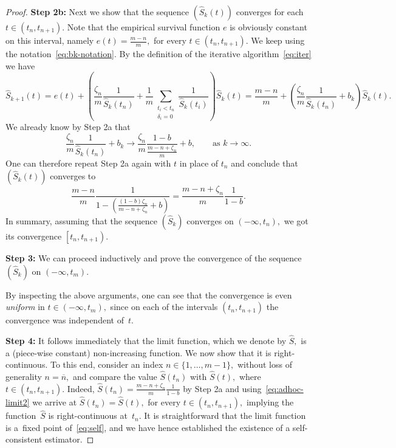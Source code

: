 \documentclass{amsart}
\theoremstyle{plain}
\theoremstyle{definition}
\def\l{\left}
\def\r{\right}
\newcommand{\rec}[1]{\frac{1}{#1}}
\def\on{\overline{n}}
\renewcommand{\hat}{\widehat}
\begin{document}
\begin{proof}
\textbf{Step 2b:} Next we show that the sequence $\l(\hat{S}_k(t)\r)$ converges for each $t\in\l(t_n,t_{n+1}\r).$ Note that the empirical survival function $e$ is obviously constant on this interval, namely $e(t)=\frac{m-n}{m},$ for every $t\in\l(t_n,t_{n+1}\r).$ We keep using the notation~\eqref{eq:bk-notation}. By the definition of the iterative algorithm~\eqref{eq:iter} we have
\begin{equation*} 
 \hat{S}_{k+1}(t) = e(t) + \l(\frac{\zeta_n}{m}\rec{\hat{S}_k\l(t_n\r)}+ \rec{m} \sum_{\substack{t_i< t_n \\ \delta_i=0}}\rec{\hat{S}_k\l(t_i\r)} \r) \hat{S}_k(t) = \frac{m-n}{m} + \l(\frac{\zeta_n}{m}\rec{\hat{S}_k\l(t_n\r)}+ b_k \r) \hat{S}_k(t) .
\end{equation*}
We already know by Step 2a that
\begin{equation*}
 \frac{\zeta_n}{m}\rec{\hat{S}_k\l(t_n\r)}+ b_k \to\frac{\zeta_n}{m} \frac{1-b}{\frac{m-n+\zeta_n}{m}}+b,\qquad \text{as } k\to\infty.
\end{equation*}
One can therefore repeat Step 2a again with $t$ in place of $t_n$ and conclude that $\l(\hat{S}_k(t)\r)$ converges to
\begin{equation} \label{eq:adhoc-limit2}
 \frac{m-n}{m}\rec{1-\l(\frac{(1-b)\zeta_n}{m-n+\zeta_n}+b\r)} = \frac{m-n+\zeta_n}{m}\rec{1-b}.
\end{equation}
In summary, assuming that the sequence $\l(\hat{S}_k\r)$ converges on $\l(-\infty,t_n\r),$ we got its convergence $\l[t_n,t_{n+1}\r).$

\textbf{Step 3:} We can proceed inductively and prove the convergence of the sequence $\l(\hat{S}_k\r)$ on $\l(-\infty,t_m\r).$ 

By inspecting the above arguments, one can see that the convergence is even \emph{uniform} in $t\in\l(-\infty,t_m\r),$ since on each of the intervals $\l(t_n,t_{n+1}\r)$ the convergence was independent of~$t.$

\textbf{Step 4:}  It follows immediately that the limit function, which we denote by $\hat{S},$ is a (piece-wise constant) non-increasing function. We now show that it is right-continuous. To this end, consider an index $n\in\{1,\dots, m-1\},$ without loss of generality $n=\on,$ and compare the value $\hat{S}\l(t_n\r)$ with $\hat{S}\l(t\r),$ where $t\in \l(t_n,t_{n+1}\r).$ Indeed, $\hat{S}\l(t_n\r)=\frac{m-n+\zeta_n}{m}\rec{1-b}$ by Step 2a and using~\eqref{eq:adhoc-limit2} we arrive at $\hat{S}\l(t_n\r)=\hat{S}(t),$ for every $t\in \l(t_n,t_{n+1}\r),$ implying the function~$\hat{S}$ is right-continuous at~$t_n.$ It is straightforward that the limit function is a~fixed point of~\eqref{eq:self}, and we have hence established the existence of a self-consistent estimator.


\end{proof}
\end{document}
